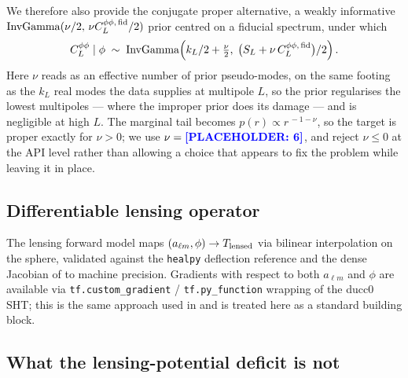 \documentclass[twocolumn,superscriptaddress,aps,prl,floatfix]{revtex4-2}
\newcommand{\alm}{a_{\ell m}}
\newcommand{\clpp}{C_L^{\phi\phi}}
\newcommand{\placeholder}[1]{\textcolor{blue}{\textbf{[PLACEHOLDER: #1]}}}
\begin{document}
We therefore also provide the conjugate proper alternative, a weakly
informative $\mathrm{InvGamma}(\nu/2,\, \nu C_L^{\phi\phi,\,\rm fid}/2)$ prior centred on
a fiducial spectrum, under which
\begin{equation}
  \clpp \mid \phi \;\sim\; \mathrm{InvGamma}\!\left(k_L/2 + \tfrac{\nu}{2},\;
  \big(S_L + \nu\,C_L^{\phi\phi,\,\rm fid}\big)/2\right).
  \label{eq:block4-proper}
\end{equation}
Here $\nu$ reads as an effective number of prior pseudo-modes, on the same
footing as the $k_L$ real modes the data supplies at multipole $L$, so the
prior regularises the lowest multipoles --- where the improper prior does its
damage --- and is negligible at high $L$. The marginal tail becomes
$p(r) \propto r^{\,-1-\nu}$, so the target is proper exactly for $\nu > 0$; we
use $\nu = \placeholder{6}$, and reject $\nu \le 0$ at the API level rather
than allowing a choice that appears to fix the problem while leaving it in
place.

\subsection{Differentiable lensing operator}
\label{sec:lensing}

The lensing forward model maps $(\alm, \phi) \to T_{\rm lensed}$ via bilinear
interpolation on the sphere, validated against the \texttt{healpy} deflection
reference and the dense Jacobian of \citet{Reinecke:2023} to machine precision.
Gradients with respect to both $\alm$ and $\phi$ are available via
\texttt{tf.custom\_gradient} / \texttt{tf.py\_function} wrapping of the ducc0
SHT; this is the same approach used in \citet{Flinch} and is treated here
as a standard building block.

\subsection{What the lensing-potential deficit is not}
\label{sec:deficit-not}
\end{document}
